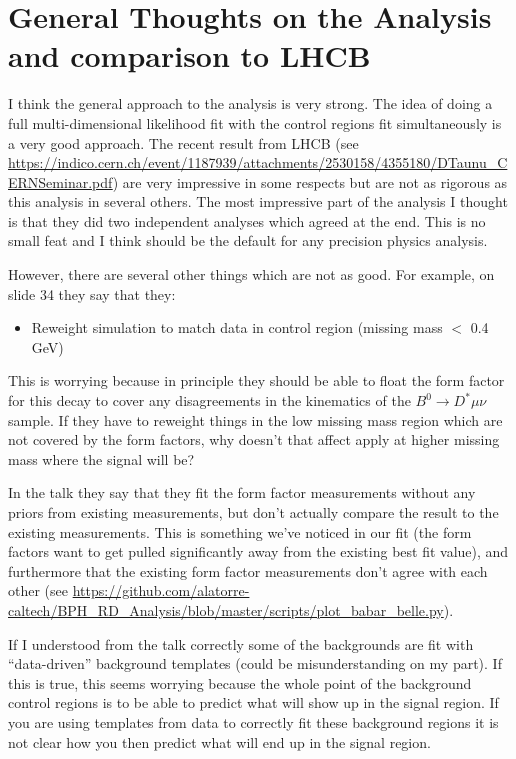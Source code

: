 \documentclass[12pt]{report}
\begin{document}
\section{General Thoughts on the Analysis and comparison to LHCB}
I think the general approach to the analysis is very strong. The idea of doing
a full multi-dimensional likelihood fit with the control regions fit
simultaneously is a very good approach. The recent result from LHCB (see
\url{https://indico.cern.ch/event/1187939/attachments/2530158/4355180/DTaunu_CERNSeminar.pdf})
are very impressive in some respects but are not as rigorous as this analysis
in several others. The most impressive part of the analysis I thought is that
they did two independent analyses which agreed at the end. This is no small
feat and I think should be the default for any precision physics analysis.

However, there are several other things which are not as good. For example, on slide 34 they say that they:
\begin{itemize}
\item Reweight simulation to match data in control region (missing mass $<$ 0.4 GeV)
\end{itemize}
This is worrying because in principle they should be able to float the form
factor for this decay to cover any disagreements in the kinematics of the $B^0
\rightarrow D^* \mu \nu$ sample. If they have to reweight things in the low
missing mass region which are not covered by the form factors, why doesn't that
affect apply at higher missing mass where the signal will be?

In the talk they say that they fit the form factor measurements without any
priors from existing measurements, but don't actually compare the result to the
existing measurements. This is something we've noticed in our fit (the form
factors want to get pulled significantly away from the existing best fit
value), and furthermore that the existing form factor measurements don't agree
with each other (see
\url{https://github.com/alatorre-caltech/BPH_RD_Analysis/blob/master/scripts/plot_babar_belle.py}).

If I understood from the talk correctly some of the backgrounds are fit with
``data-driven'' background templates (could be misunderstanding on my part). If
this is true, this seems worrying because the whole point of the background
control regions is to be able to predict what will show up in the signal
region. If you are using templates from data to correctly fit these background
regions it is not clear how you then predict what will end up in the signal
region.
\end{document}

